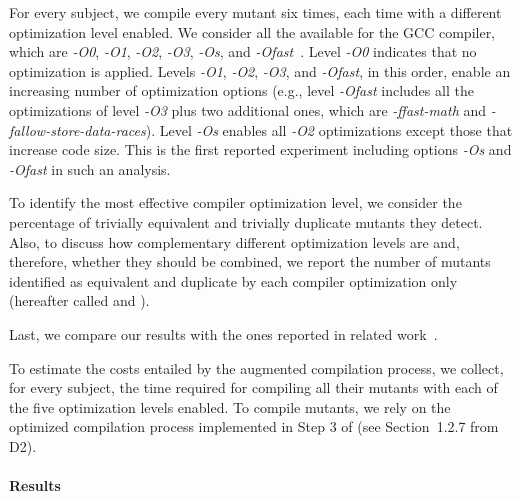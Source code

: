 For every subject, we compile every mutant six times, each time with a different optimization level enabled. We consider all the available  for the GCC compiler, which are \emph{-O0}, \emph{-O1}, \emph{-O2}, \emph{-O3}, \emph{-Os},
and \emph{-Ofast}~\cite{GCCopt}. Level \emph{-O0} indicates that no optimization is applied. Levels \emph{-O1}, \emph{-O2}, \emph{-O3}, and \emph{-Ofast}, in this order, enable an increasing number of optimization options (e.g., level \emph{-Ofast} includes all the optimizations of level \emph{-O3} plus two additional ones, which are \emph{-ffast-math} and \emph{-fallow-store-data-races}). Level \emph{-Os} enables all \emph{-O2} optimizations except those that increase code size. This is the first reported experiment including options \emph{-Os} and \emph{-Ofast} in such an analysis.
 

To identify the most effective compiler optimization level, we consider the percentage of trivially equivalent and trivially duplicate mutants they detect. Also, to discuss how complementary different optimization levels  are and, therefore, whether they should be combined, we report the number of mutants identified as equivalent and duplicate by each compiler optimization only (hereafter called  and ). 

Last, we compare our results with the ones reported in related work~\cite{papadakis2015trivial}.

To estimate the costs entailed by the augmented compilation process, we collect, for every subject, the time required for compiling all their mutants with each of the five optimization levels enabled. To compile mutants, we rely on the optimized compilation process implemented in Step 3 of \APPR (see Section~1.2.7 from D2).



\paragraph{Results}

